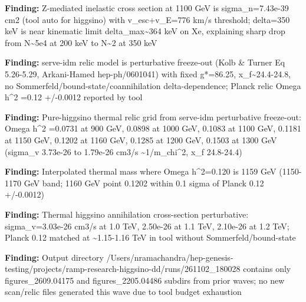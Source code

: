 \documentclass[11pt,a4paper]{article}
\begin{document}
\textbf{Finding:} Z-mediated inelastic cross section at 1100 GeV is sigma\_n=7.43e-39 cm2 (tool auto for higgsino) with v\_esc+v\_E=776 km/s threshold; delta=350 keV is near kinematic limit delta\_max\textasciitilde{}364 keV on Xe, explaining sharp drop from N\textasciitilde{}5e4 at 200 keV to N\textasciitilde{}2 at 350 keV

\textbf{Finding:} serve-idm relic model is perturbative freeze-out (Kolb \& Turner Eq 5.26-5.29, Arkani-Hamed hep-ph/0601041) with fixed g*=86.25, x\_f\textasciitilde{}24.4-24.8, no Sommerfeld/bound-state/coannihilation delta-dependence; Planck relic Omega h\textasciicircum{}2 =0.12 +/-0.0012 reported by tool

\textbf{Finding:} Pure-higgsino thermal relic grid from serve-idm perturbative freeze-out: Omega h\textasciicircum{}2 =0.0731 at 900 GeV, 0.0898 at 1000 GeV, 0.1083 at 1100 GeV, 0.1181 at 1150 GeV, 0.1202 at 1160 GeV, 0.1285 at 1200 GeV, 0.1503 at 1300 GeV (sigma\_v 3.73e-26 to 1.79e-26 cm3/s \textasciitilde{}1/m\_chi\textasciicircum{}2, x\_f 24.8-24.4)

\textbf{Finding:} Interpolated thermal mass where Omega h\textasciicircum{}2=0.120 is 1159 GeV (1150-1170 GeV band; 1160 GeV point 0.1202 within 0.1 sigma of Planck 0.12 +/-0.0012)

\textbf{Finding:} Thermal higgsino annihilation cross-section perturbative: sigma\_v=3.03e-26 cm3/s at 1.0 TeV, 2.50e-26 at 1.1 TeV, 2.10e-26 at 1.2 TeV; Planck 0.12 matched at \textasciitilde{}1.15-1.16 TeV in tool without Sommerfeld/bound-state

\textbf{Finding:} Output directory /Users/nramachandra/hep-genesis-testing/projects/ramp-research-higgsino-dd/runs/261102\_180028 contains only figures\_2609.04175 and figures\_2205.04486 subdirs from prior waves; no new scan/relic files generated this wave due to tool budget exhaustion
\end{document}
